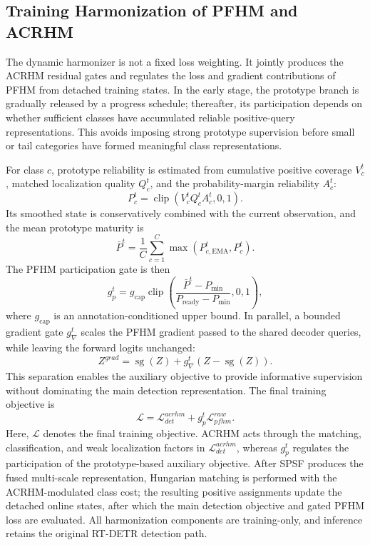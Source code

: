 \documentclass[letterpaper,journal]{IEEEtran}
\begin{document}
\subsection{Training Harmonization of PFHM and ACRHM}
\label{sec:harmonization}
The dynamic harmonizer is not a fixed loss weighting. It jointly produces the ACRHM residual gates and regulates the loss and gradient contributions of PFHM from detached training states. In the early stage, the prototype branch is gradually released by a progress schedule; thereafter, its participation depends on whether sufficient classes have accumulated reliable positive-query representations. This avoids imposing strong prototype supervision before small or tail categories have formed meaningful class representations.

For class $c$, prototype reliability is estimated from cumulative positive coverage $V_c^t$, matched localization quality $Q_c^t$, and the probability-margin reliability $A_c^t$:
\begin{equation}
P_c^t=\operatorname{clip}(V_c^tQ_c^tA_c^t,0,1).
\end{equation}
Its smoothed state is conservatively combined with the current observation, and the mean prototype maturity is
\begin{equation}
\bar P^t=\frac{1}{C}\sum_{c=1}^{C}
\max(P_{c,\mathrm{EMA}}^t,P_c^t).
\end{equation}
The PFHM participation gate is then
\begin{equation}
g_p^t=g_{\mathrm{cap}}
\operatorname{clip}\left(
\frac{\bar P^t-P_{\min}}{P_{\mathrm{ready}}-P_{\min}},0,1
\right),
\end{equation}
where $g_{\mathrm{cap}}$ is an annotation-conditioned upper bound. In parallel, a bounded gradient gate $g_{\nabla}^t$ scales the PFHM gradient passed to the shared decoder queries, while leaving the forward logits unchanged:
\begin{equation}
Z^{grad}=\operatorname{sg}(Z)+g_{\nabla}^t
\left(Z-\operatorname{sg}(Z)\right).
\end{equation}
This separation enables the auxiliary objective to provide informative supervision without dominating the main detection representation. The final training objective is
\begin{equation}
\mathcal{L}=\mathcal{L}_{det}^{acrhm}+g_p^t\mathcal{L}_{pfhm}^{raw}.
\end{equation}
Here, $\mathcal{L}$ denotes the final training objective. ACRHM acts through the matching, classification, and weak localization factors in $\mathcal{L}_{det}^{acrhm}$, whereas $g_p^t$ regulates the participation of the prototype-based auxiliary objective. After SPSF produces the fused multi-scale representation, Hungarian matching is performed with the ACRHM-modulated class cost; the resulting positive assignments update the detached online states, after which the main detection objective and gated PFHM loss are evaluated. All harmonization components are training-only, and inference retains the original RT-DETR detection path.
\end{document}
